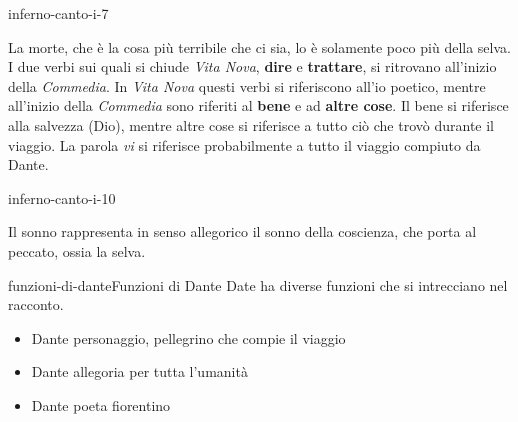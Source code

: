 \documentclass[preview]{standalone}
\begin{document}
\begin{snippet}{inferno-canto-i-7}
    
    La morte, che è la cosa più terribile che ci sia, lo è solamente poco più della selva.
    \\
    I due verbi sui quali si chiude \textit{Vita Nova},
    \textbf{dire} e \textbf{trattare}, si ritrovano all'inizio della \textit{Commedia}.
    In \textit{Vita Nova} questi verbi si riferiscono all'io poetico, mentre all'inizio della \textit{Commedia}
    sono riferiti al \textbf{bene} e ad \textbf{altre cose}.
    Il bene si riferisce alla salvezza (Dio), mentre altre cose si riferisce a tutto ciò che trovò durante il viaggio.
    La parola \textit{vi} si riferisce probabilmente a tutto il viaggio compiuto da Dante.
\end{snippet}

\begin{snippet}{inferno-canto-i-10}
    
    Il sonno rappresenta in senso allegorico il sonno della coscienza,
    che porta al peccato, ossia la selva.
\end{snippet}

\begin{snippetnote}{funzioni-di-dante}{Funzioni di Dante}
    Date ha diverse funzioni che si intrecciano nel racconto.
    \begin{itemize}
        \item Dante personaggio, pellegrino che compie il viaggio
        \item Dante allegoria per tutta l'umanità
        \item Dante poeta fiorentino
    \end{itemize}
\end{snippetnote}
\end{document}
